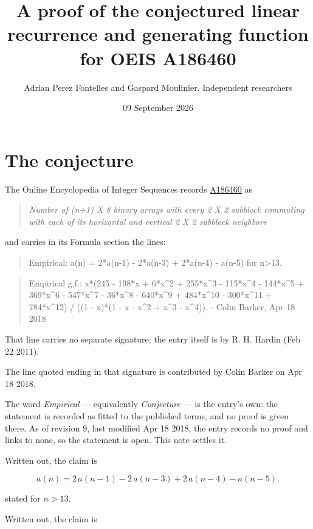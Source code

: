 \documentclass[11pt]{article}
\title{A proof of the conjectured linear recurrence and generating function for OEIS A186460}
\author{Adrian Perez Fontelles and Gaspard Moulinier, Independent researchers}
\date{09 September 2026}
\theoremstyle{definition}
\begin{document}
\maketitle
\section{The conjecture}

The Online Encyclopedia of Integer Sequences records \href{https://oeis.org/A186460}{A186460} as

\begin{quote}\itshape Number of (n+1) X 8 binary arrays with every 2 X 2 subblock commuting with each of its horizontal and vertical 2 X 2 subblock neighbors\end{quote}

and carries in its Formula section the lines:

\begin{quote}\ttfamily Empirical: a(n) = 2*a(n-1) - 2*a(n-3) + 2*a(n-4) - a(n-5) for n>13.\end{quote}

\begin{quote}\ttfamily Empirical g.f.: x*(245 - 198*x + 6*x\textasciicircum{}2 + 255*x\textasciicircum{}3 - 115*x\textasciicircum{}4 - 144*x\textasciicircum{}5 + 369*x\textasciicircum{}6 - 547*x\textasciicircum{}7 - 36*x\textasciicircum{}8 - 640*x\textasciicircum{}9 + 484*x\textasciicircum{}10 - 300*x\textasciicircum{}11 + 784*x\textasciicircum{}12) / ((1 - x)*(1 - x - x\textasciicircum{}2 + x\textasciicircum{}3 - x\textasciicircum{}4)). - Colin Barker, Apr 18 2018\end{quote}

That line carries no separate signature; the entry itself is by R. H. Hardin (Feb 22 2011).

The line quoted ending in that signature is contributed by Colin Barker on Apr 18 2018.

The word {\itshape Empirical} --- equivalently {\itshape Conjecture} --- is the entry's own: the statement is recorded as fitted to the published terms, and no proof is given there. As of revision 9, last modified Apr 18 2018, the entry records no proof and links to none, so the statement is open. This note settles it.

Written out, the claim is

\[a(n) = 2\,a(n-1) - 2\,a(n-3) + 2\,a(n-4) - a(n-5).\]

stated for $n > 13$.

Written out, the claim is
\end{document}
